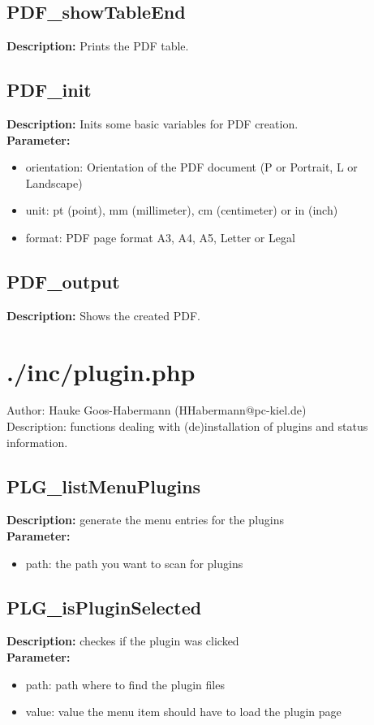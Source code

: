 \subsection{PDF\_showTableEnd}
\textbf{Description:} Prints the PDF table.\\

\subsection{PDF\_init}
\textbf{Description:} Inits some basic variables for PDF creation.\\
\textbf{Parameter:}
\begin{itemize}
\item orientation: Orientation of the PDF document (P or Portrait, L or Landscape)
\item unit: pt (point), mm (millimeter), cm (centimeter) or in (inch)
\item format: PDF page format A3, A4, A5, Letter or Legal
\end{itemize}

\subsection{PDF\_output}
\textbf{Description:} Shows the created PDF.\\

\newpage\section{./inc/plugin.php}
 Author: Hauke Goos-Habermann (HHabermann@pc-kiel.de)\\
 Description: functions dealing with (de)installation of plugins and status information.\\

\subsection{PLG\_listMenuPlugins}
\textbf{Description:} generate the menu entries for the plugins\\
\textbf{Parameter:}
\begin{itemize}
\item path: the path you want to scan for plugins
\end{itemize}

\subsection{PLG\_isPluginSelected}
\textbf{Description:} checkes if the plugin was clicked\\
\textbf{Parameter:}
\begin{itemize}
\item path: path where to find the plugin files
\item value: value the menu item should have to load the plugin page
\end{itemize}

